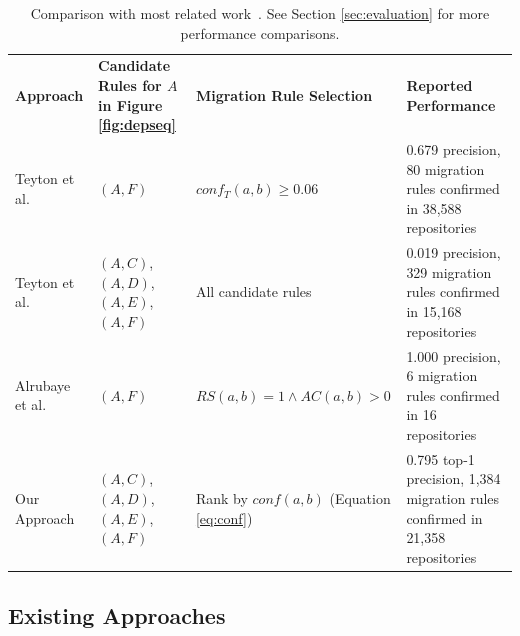\documentclass[conference, 10pt]{IEEEtran}
\begin{document}
\begin{table}[]
\caption{Comparison with most related work~\cite{2012WCRE-Teyton-Mining,2014JournalOfSysAndSoft-Teyton-Study,2019ICSME-Alrubaye-MigrationMiner}. See Section \ref{sec:evaluation} for more performance comparisons.}
\centering
\begin{tabular}{|l|m{45mm}|l|m{50mm}|}
\hline
 \textbf{Approach} & \textbf{Candidate Rules for $A$ in Figure \ref{fig:depseq}} & \textbf{Migration Rule Selection} & \textbf{Reported Performance}  \\ 
 \hhline{|=|=|=|=|}
 Teyton et al.~\cite{2012WCRE-Teyton-Mining} & $(A,F)$ & $conf_T(a,b) \ge 0.06$ & 0.679 precision, 80 migration rules \newline confirmed in 38,588 repositories\\ \hline
 Teyton et al.~\cite{2014JournalOfSysAndSoft-Teyton-Study} & $(A,C)$, $(A,D)$, $(A,E)$, $(A,F)$ & All candidate rules & 0.019 precision, 329 migration rules \newline confirmed in 15,168 repositories\\ \hline
 Alrubaye et al.~\cite{2019ICSME-Alrubaye-MigrationMiner} & $(A,F)$ & $RS(a,b) = 1 \land AC(a,b) > 0$ & 1.000 precision, 6 migration rules \newline confirmed in 16 repositories \\ \hline
 Our Approach &  $(A,C)$, $(A,D)$, $(A,E)$, $(A,F)$ & Rank by $conf(a,b)$ (Equation \ref{eq:conf}) & 0.795 top-1 precision, 1,384 migration rules \newline confirmed in 21,358 repositories\\
 \hline
\end{tabular}
\label{tab:related-work}
\vspace{-5mm}
\end{table}

\subsection{Existing Approaches}
\label{subsec:bg-existing}
\end{document}
